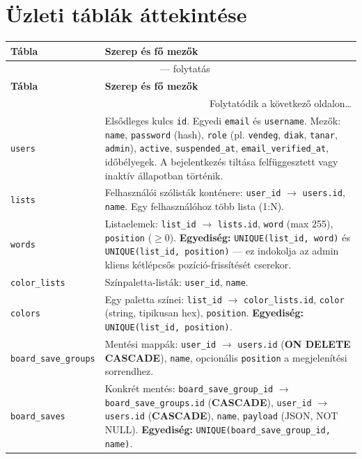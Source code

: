 \section{Üzleti táblák áttekintése}
\begin{longtable}{@{}p{3.2cm}p{10.5cm}@{}}
\toprule
\textbf{Tábla} & \textbf{Szerep és fő mezők} \\
\midrule
\endfirsthead
\multicolumn{2}{c}{\tablename\ \thetable{} — folytatás} \\
\toprule
\textbf{Tábla} & \textbf{Szerep és fő mezők} \\
\midrule
\endhead
\midrule
\multicolumn{2}{r}{Folytatódik a következő oldalon\ldots} \\
\endfoot
\bottomrule
\endlastfoot

\texttt{users} &
Elsődleges kulcs \texttt{id}. Egyedi \texttt{email} és \texttt{username}. Mezők: \texttt{name}, \texttt{password} (hash), \texttt{role} (pl. \texttt{vendeg}, \texttt{diak}, \texttt{tanar}, \texttt{admin}), \texttt{active}, \texttt{suspended\_at}, \texttt{email\_verified\_at}, időbélyegek. A bejelentkezés tiltása felfüggesztett vagy inaktív állapotban történik. \\

\texttt{lists} &
Felhasználói szólisták konténere: \texttt{user\_id} $\rightarrow$ \texttt{users.id}, \texttt{name}. Egy felhasználóhoz több lista (1:N). \\

\texttt{words} &
Listaelemek: \texttt{list\_id} $\rightarrow$ \texttt{lists.id}, \texttt{word} (max 255), \texttt{position} ($\geq 0$). \textbf{Egyediség:} \texttt{UNIQUE(list\_id, word)} és \texttt{UNIQUE(list\_id, position)} — ez indokolja az admin kliens kétlépcsős pozíció-frissítését cserekor. \\

\texttt{color\_lists} &
Színpaletta-listák: \texttt{user\_id}, \texttt{name}. \\

\texttt{colors} &
Egy paletta színei: \texttt{list\_id} $\rightarrow$ \texttt{color\_lists.id}, \texttt{color} (string, tipikusan hex), \texttt{position}. \textbf{Egyediség:} \texttt{UNIQUE(list\_id, position)}. \\

\texttt{board\_save\_groups} &
Mentési mappák: \texttt{user\_id} $\rightarrow$ \texttt{users.id} (\textbf{ON DELETE CASCADE}), \texttt{name}, opcionális \texttt{position} a megjelenítési sorrendhez. \\

\texttt{board\_saves} &
Konkrét mentés: \texttt{board\_save\_group\_id} $\rightarrow$ \texttt{board\_save\_groups.id} (\textbf{CASCADE}), \texttt{user\_id} $\rightarrow$ \texttt{users.id} (\textbf{CASCADE}), \texttt{name}, \texttt{payload} (JSON, NOT NULL). \textbf{Egyediség:} \texttt{UNIQUE(board\_save\_group\_id, name)}. \\
\end{longtable}


